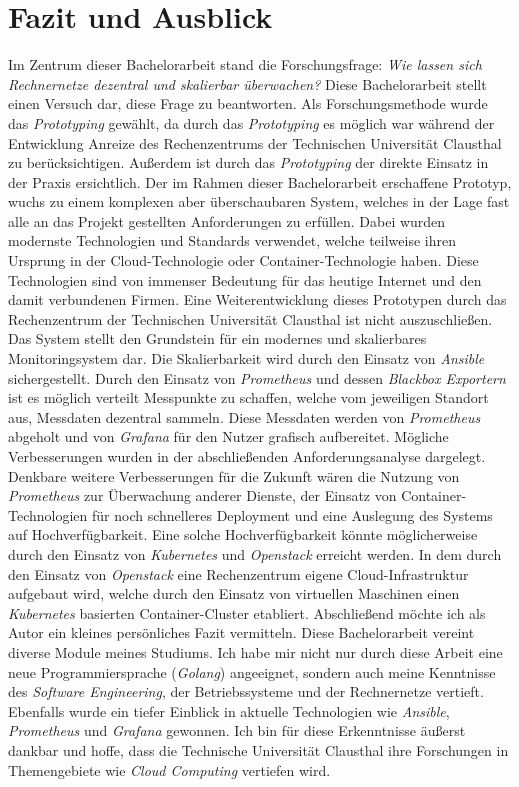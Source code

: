 \documentclass[titlepage]{report}
\begin{document}
\chapter{Fazit und Ausblick}
Im Zentrum dieser Bachelorarbeit stand die Forschungsfrage: \emph{Wie
lassen sich Rechnernetze dezentral und skalierbar überwachen?} Diese
Bachelorarbeit stellt einen Versuch dar, diese Frage zu beantworten. Als
Forschungsmethode wurde das \emph{Prototyping} gewählt, da durch das
\emph{Prototyping} es möglich war während der Entwicklung Anreize des
Rechenzentrums der Technischen Universität Clausthal zu berücksichtigen.
Außerdem ist durch das \emph{Prototyping} der direkte Einsatz in der
Praxis ersichtlich. Der im Rahmen dieser Bachelorarbeit erschaffene
Prototyp, wuchs zu einem komplexen aber überschaubaren System, welches
in der Lage fast alle an das Projekt gestellten Anforderungen zu
erfüllen. Dabei wurden modernste Technologien und Standards verwendet,
welche teilweise ihren Ursprung in der Cloud\hyp{}Technologie
oder Container\hyp{}Technologie haben. Diese Technologien sind
von immenser Bedeutung für das heutige Internet und den damit
verbundenen Firmen. Eine Weiterentwicklung dieses Prototypen durch das
Rechenzentrum der Technischen Universität Clausthal ist nicht
auszuschließen. Das System stellt den Grundstein für ein modernes und
skalierbares Monitoringsystem dar. Die Skalierbarkeit wird durch den
Einsatz von \emph{Ansible} sichergestellt. Durch den Einsatz von
\emph{Prometheus} und dessen \emph{Blackbox Exportern} ist es möglich
verteilt Messpunkte zu schaffen, welche vom jeweiligen Standort aus,
Messdaten dezentral sammeln. Diese Messdaten werden von
\emph{Prometheus} abgeholt und von \emph{Grafana} für den Nutzer
grafisch aufbereitet. Mögliche Verbesserungen wurden in der
abschließenden Anforderungsanalyse dargelegt. Denkbare weitere
Verbesserungen für die Zukunft wären die Nutzung von \emph{Prometheus}
zur Überwachung anderer Dienste, der Einsatz von
Container\hyp{}Technologien für noch schnelleres Deployment und
eine Auslegung des Systems auf Hochverfügbarkeit. Eine solche
Hochverfügbarkeit könnte möglicherweise durch den Einsatz von
\emph{Kubernetes} und \emph{Openstack} erreicht werden. In dem durch den
Einsatz von \emph{Openstack} eine Rechenzentrum eigene
Cloud\hyp{}Infrastruktur aufgebaut wird, welche durch den Einsatz
von virtuellen Maschinen einen \emph{Kubernetes} basierten
Container\hyp{}Cluster etabliert. Abschließend möchte ich als Autor ein
kleines persönliches Fazit vermitteln. Diese Bachelorarbeit vereint
diverse Module meines Studiums. Ich habe mir nicht nur durch diese
Arbeit eine neue Programmiersprache (\emph{Golang}) angeeignet, sondern
auch meine Kenntnisse des \emph{Software Engineering}, der
Betriebssysteme und der Rechnernetze vertieft. Ebenfalls wurde ein
tiefer Einblick in aktuelle Technologien wie \emph{Ansible},
\emph{Prometheus} und \emph{Grafana} gewonnen. Ich bin für diese
Erkenntnisse äußerst dankbar und hoffe, dass die Technische Universität
Clausthal ihre Forschungen in Themengebiete wie \emph{Cloud Computing}
vertiefen wird.

\nocite{*}
\printbibliography{}
\lstlistoflistings{}
\listoftables{}
\listoffigures
\printglossary{}
\end{document}
